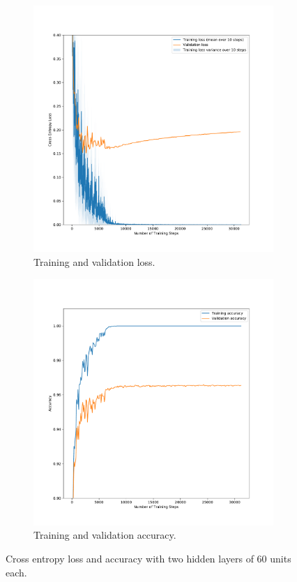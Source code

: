 \begin{figure}[h!]
  \centering
  \begin{subfigure}[b]{0.49\textwidth}
    \includegraphics[clip, trim=1cm 0cm 1cm 0cm, width=\textwidth]{figures/Task4d_loss.pdf}
    \caption{Training and validation loss.}
  \end{subfigure}
  \hfill
  \begin{subfigure}[b]{0.49\textwidth}
    \includegraphics[clip, trim=1cm 0cm 1cm 0cm, width=\textwidth]{figures/Task4d_accuracy.pdf}
    \caption{Training and validation accuracy.}
  \end{subfigure}
  \caption{Cross entropy loss and accuracy with two hidden layers of 60 units each.}
  \label{fig:task4:d}
\end{figure}

